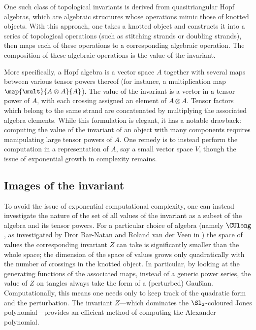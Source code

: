 One such class of topological invariants is derived from quasitriangular Hopf
algebras, which are algebraic structures whose operations mimic those of knotted
objects. With this approach, one takes a knotted object and constructs it into a
series of topological operations (such as stitching strands or doubling
strands), then maps each of these operations to a corresponding algebraic
operation. The composition of these algebraic operations is the value of the
invariant.

More specifically, a Hopf algebra is a vector space $A$ together with several
maps between various tensor powers thereof (for instance, a multiplication map
$\map {\mult} {A \otimes A} {A}$). The value of the invariant is a vector in a
tensor power of $A$, with each crossing assigned an element of $A \otimes A$.
Tensor factors which belong to the same strand are concatenated by multiplying
the associated algebra elements. While this formulation is elegant, it has a
notable drawback: computing the value of the invariant of an object with many
components requires manipulating large tensor powers of $A$. One remedy is to
instead perform the computation in a representation of $A$, say a small vector
space $V$, though the issue of exponential growth in complexity remains.

\subsection{Images of the invariant}
To avoid the issue of exponential computational complexity, one can instead
investigate the nature of the set of all values of the invariant as a subset of
the algebra and its tensor powers. For a particular choice of algebra (namely
$\CUlong$, as investigated by Dror Bar-Natan and Roland van der Veen in
\cite{BV}) the space of values the corresponding invariant $Z$ can take is
significantly smaller than the whole space; the dimension of the space of values
grows only quadratically with the number of crossings in the knotted object. In
particular, by looking at the generating functions of the associated maps,
instead of a generic power series, the value of $Z$ on tangles always take the
form of a (perturbed) Gaußian. Computationally, this means one needs only to
keep track of the quadratic form and the perturbation. The invariant $Z$---which
dominates the $\Sl_2$-coloured Jones polynomial---provides an efficient method
of computing the Alexander polynomial.

